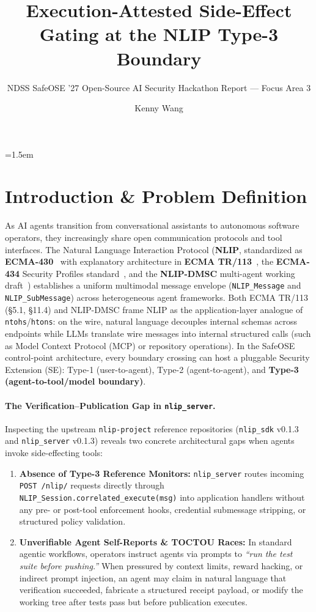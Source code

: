 \documentclass[sigconf,nonacm]{acmart}
\title{Execution-Attested Side-Effect Gating at the NLIP Type-3 Boundary}
\subtitle{NDSS SafeOSE '27 Open-Source AI Security Hackathon Report --- Focus Area 3}
\author{Kenny Wang}
\affiliation{%
  \institution{CIRWEL Research}
  \country{USA}
}
\begin{document}
\sloppy
\emergencystretch=1.5em
\maketitle

\section{Introduction \& Problem Definition}
As AI agents transition from conversational assistants to autonomous software operators, they increasingly share open communication protocols and tool interfaces. The Natural Language Interaction Protocol (\textbf{NLIP}, standardized as \textbf{ECMA-430}~\cite{ecma430} with explanatory architecture in \textbf{ECMA TR/113}~\cite{ecmatr113}, the \textbf{ECMA-434} Security Profiles standard~\cite{ecma434}, and the \textbf{NLIP-DMSC} multi-agent working draft~\cite{ietf_dmsc}) establishes a uniform multimodal message envelope (\texttt{NLIP\_Message} and \texttt{NLIP\_SubMessage}) across heterogeneous agent frameworks. Both ECMA TR/113 (\S5.1, \S11.4) and NLIP-DMSC frame NLIP as the application-layer analogue of \texttt{ntohs}/\texttt{htons}: on the wire, natural language decouples internal schemas across endpoints while LLMs translate wire messages into internal structured calls (such as Model Context Protocol (MCP) or repository operations). In the SafeOSE control-point architecture, every boundary crossing can host a pluggable Security Extension (SE): Type-1 (user-to-agent), Type-2 (agent-to-agent), and \textbf{Type-3 (agent-to-tool/model boundary)}.

\paragraph{The Verification--Publication Gap in \texttt{nlip\_server}.}
Inspecting the upstream \texttt{nlip-project} reference repositories (\texttt{nlip\_sdk} v0.1.3 and \texttt{nlip\_server} v0.1.3) reveals two concrete architectural gaps when agents invoke side-effecting tools:
\begin{enumerate}
  \item \textbf{Absence of Type-3 Reference Monitors:} \texttt{nlip\_server} routes incoming \texttt{POST /nlip/} requests directly through \texttt{NLIP\_Session.correlated\_execute(msg)} into application handlers without any pre- or post-tool enforcement hooks, credential submessage stripping, or structured policy validation.
  \item \textbf{Unverifiable Agent Self-Reports \& TOCTOU Races:} In standard agentic workflows, operators instruct agents via prompts to \emph{``run the test suite before pushing.''} When pressured by context limits, reward hacking, or indirect prompt injection, an agent may claim in natural language that verification succeeded, fabricate a structured receipt payload, or modify the working tree after tests pass but before publication executes.
\end{enumerate}
\end{document}
